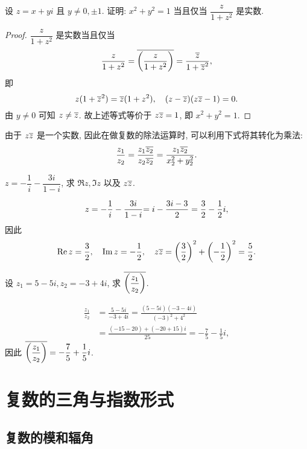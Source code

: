 \begin{example}
  设 $z=x+yi$ 且 $y\neq 0,\pm1$. 证明: $x^2+y^2=1$ 当且仅当 $\dfrac z{1+z^2}$ 是实数.
\end{example}
\begin{proof}
  $\dfrac z{1+z^2}$ 是实数当且仅当
    \[\frac z{1+z^2}=\overline{\left(\frac z{1+z^2}\right)}=\frac{\overline z}{1+{\overline z}^2},\]
  即
    \[z(1+{\overline z}^2)=\overline z(1+z^2),\quad (z-\overline z)(z\overline z-1)=0.\]%
  由 $y\neq0$ 可知 $z\neq \overline z$.
  故上述等式等价于 $z\overline z=1$, 即 $x^2+y^2=1$.
\end{proof}

由于 $z\overline z$ 是一个实数,
因此在做复数的除法运算时, 可以利用下式将其转化为乘法:
  \[\dfrac{z_1}{z_2}=\dfrac{z_1\overline{z_2}}{z_2\overline{z_2}}=\dfrac{z_1\overline{z_2}}{x_2^2+y_2^2}.\]
\begin{example}
  $z=-\dfrac1i-\dfrac{3i}{1-i}$, 求 $\Re z,\Im z$ 以及 $z\overline z$.
\end{example}
\begin{solution}
  \[z=-\frac1i-\frac{3i}{1-i}
  {=i-\frac{3i-3}2=\frac32-\frac{1}{2} i,}\]
  因此
    \[\operatorname{Re} z=\frac32,\quad\operatorname{Im} z=-\frac{1}{2} ,\quad
    z\overline z=\left(\frac32\right)^2+\left(-\frac{1}{2}\right)^2=\frac52.\]
\end{solution}

\begin{example}
  设 $z_1=5-5i,z_2=-3+4i$, 求 $\overline{\left(\dfrac{z_1}{z_2}\right)}$.
\end{example}
\begin{solution}
  \begin{align*}
    \frac{z_1}{z_2}&=\frac{5-5i}{-3+4i}
    =\frac{(5-5i)(-3-4i)}{(-3)^2+4^2}\\
    &=\frac{(-15-20)+(-20+15)i}{25}=-\frac75-\frac15i,
  \end{align*}
  因此 $\overline{\left(\dfrac{z_1}{z_2}\right)}=-\dfrac75+\dfrac15i$.
\end{solution}


\section{复数的三角与指数形式}

\subsection{复数的模和辐角}

